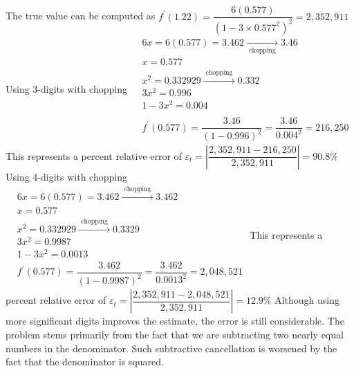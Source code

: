 \documentclass[../main.tex]{subfiles}
\begin{document}
\chapter{}
\label{cha:cha_4}


\section{}
The true value can be computed as
\bigbreak
$f^{\prime}(1.22)=\dfrac{6(0.577)}{\left(1-3 \times 0.577^{2}\right)^{2}}=2,352,911$
\bigbreak
Using 3-digits with chopping
\bigbreak
$
\begin{aligned}
&6 x=6(0.577)=3.462 \underset{\text { chopping }}{\longrightarrow} 3.46 \\
&x=0.577 \\
&x^{2}=0.332929 \stackrel{\text { chopping }}{\longrightarrow} 0.332 \\
&3 x^{2}=0.996 \\
&1-3 x^{2}=0.004 \\ \\
&f^{\prime}(0.577)=\dfrac{3.46}{(1-0.996)^{2}}=\dfrac{3.46}{0.004^{2}}=216,250
\end{aligned}
$
\bigbreak
This represents a percent relative error of
\bigbreak
$\varepsilon_{t}=\left|\dfrac{2,352,911-216,250}{2,352,911}\right|=90.8 \%$
\bigbreak
Using 4-digits with chopping
\bigbreak
$
\begin{aligned}
&6 x=6(0.577)=3.462 \stackrel{\text { chopping }}{\longrightarrow} 3.462 \\
&x=0.577 \\
&x^{2}=0.332929 \stackrel{\text { chopping }}{\longrightarrow} 0.3329 \\
&3 x^{2}=0.9987 \\
&1-3 x^{2}=0.0013 \\
&f^{\prime}(0.577)=\dfrac{3.462}{(1-0.9987)^{2}}=\dfrac{3.462}{0.0013^{2}}=2,048,521
\end{aligned}
$
\bigbreak
This represents a percent relative error of
\bigbreak
$\varepsilon_{t}=\left|\dfrac{2,352,911-2,048,521}{2,352,911}\right|=12.9 \%$
\bigbreak
Although using more significant digits improves the estimate, the error is still considerable. The problem stems primarily from the fact that we are subtracting two nearly equal numbers in the denominator. Such subtractive cancellation is worsened by the fact that the denominator is squared.
\bigbreak
\end{document}
